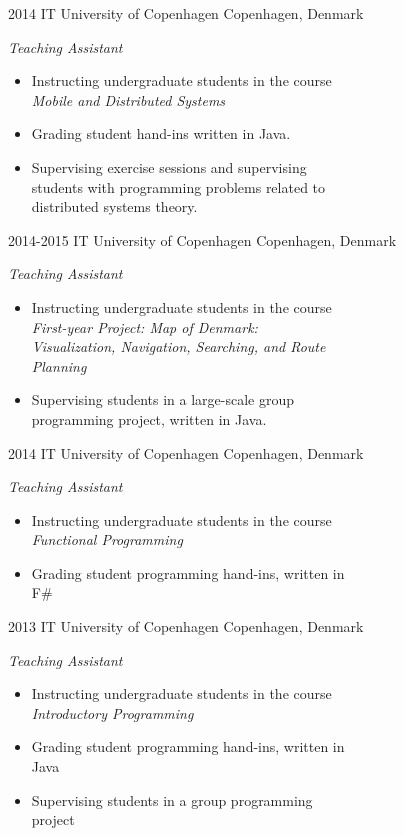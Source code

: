 \documentclass[]{friggeri-cv} %
\begin{document}
\begin{entrylist}
{\begin{itemize}
\end{itemize}}
\entry
{2014}
{IT University of Copenhagen}
{Copenhagen, Denmark}
{\emph{Teaching Assistant}
\begin{itemize}
	\item Instructing undergraduate students in the course \\\emph{Mobile and Distributed Systems}
	\item Grading student hand-ins written in Java.
	\item Supervising exercise sessions and supervising\\students with programming problems related to\\distributed systems theory.
\end{itemize}}
\end{entrylist}
\begin{entrylist}
\entry
{2014-2015}
{IT University of Copenhagen}
{Copenhagen, Denmark}
{\emph{Teaching Assistant}
\begin{itemize}
	\item Instructing undergraduate students in the course \\\emph{First-year Project: Map of Denmark:\\Visualization, Navigation, Searching, and Route\\Planning}
	\item Supervising students in a large-scale group\\programming project, written in Java.
\end{itemize}}
\end{entrylist}
\begin{entrylist} 
\entry
{2014}
{IT University of Copenhagen}
{Copenhagen, Denmark}
{\emph{Teaching Assistant}
\begin{itemize}
	\item Instructing undergraduate students in the course \\\emph{Functional Programming}
	\item Grading student programming hand-ins, written in\\F\#
\end{itemize}}
\entry
{2013}
{IT University of Copenhagen}
{Copenhagen, Denmark}
{\emph{Teaching Assistant}
\begin{itemize}
	\item Instructing undergraduate students in the course \\\emph{Introductory Programming}
	\item Grading student programming hand-ins, written in\\Java
	\item Supervising students in a group programming\\project
\end{itemize}}
\end{entrylist}
\end{document}
